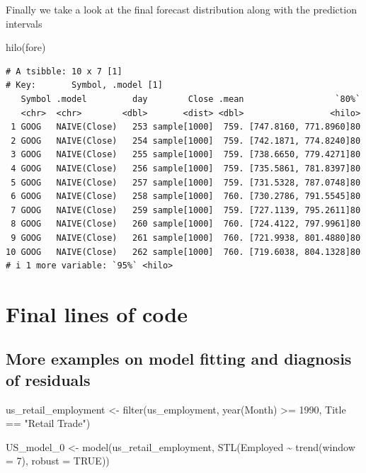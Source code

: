\documentclass[
  letterpaper,
  DIV=11,
  numbers=noendperiod]{scrartcl}
\newenvironment{Shaded}{\begin{snugshade}}{\end{snugshade}}
\newcommand{\AttributeTok}[1]{\textcolor[rgb]{0.40,0.45,0.13}{#1}}
\newcommand{\ConstantTok}[1]{\textcolor[rgb]{0.56,0.35,0.01}{#1}}
\newcommand{\DecValTok}[1]{\textcolor[rgb]{0.68,0.00,0.00}{#1}}
\newcommand{\FunctionTok}[1]{\textcolor[rgb]{0.28,0.35,0.67}{#1}}
\newcommand{\NormalTok}[1]{\textcolor[rgb]{0.00,0.23,0.31}{#1}}
\newcommand{\OtherTok}[1]{\textcolor[rgb]{0.00,0.23,0.31}{#1}}
\newcommand{\SpecialCharTok}[1]{\textcolor[rgb]{0.37,0.37,0.37}{#1}}
\newcommand{\StringTok}[1]{\textcolor[rgb]{0.13,0.47,0.30}{#1}}
\newcommand*\circled[1]{\tikz[baseline=(char.base)]{
          \node[shape=circle,draw,inner sep=1pt] (char) {{\scriptsize#1}};}}
\begin{document}
Finally we take a look at the final forecast distribution along with the
prediction intervals

\begin{Shaded}
\begin{Highlighting}[]
\FunctionTok{hilo}\NormalTok{(fore)}
\end{Highlighting}
\end{Shaded}

\begin{verbatim}
# A tsibble: 10 x 7 [1]
# Key:       Symbol, .model [1]
   Symbol .model         day        Close .mean                  `80%`
   <chr>  <chr>        <dbl>       <dist> <dbl>                 <hilo>
 1 GOOG   NAIVE(Close)   253 sample[1000]  759. [747.8160, 771.8960]80
 2 GOOG   NAIVE(Close)   254 sample[1000]  759. [742.1871, 774.8240]80
 3 GOOG   NAIVE(Close)   255 sample[1000]  759. [738.6650, 779.4271]80
 4 GOOG   NAIVE(Close)   256 sample[1000]  759. [735.5861, 781.8397]80
 5 GOOG   NAIVE(Close)   257 sample[1000]  759. [731.5328, 787.0748]80
 6 GOOG   NAIVE(Close)   258 sample[1000]  760. [730.2786, 791.5545]80
 7 GOOG   NAIVE(Close)   259 sample[1000]  759. [727.1139, 795.2611]80
 8 GOOG   NAIVE(Close)   260 sample[1000]  760. [724.4122, 797.9961]80
 9 GOOG   NAIVE(Close)   261 sample[1000]  760. [721.9938, 801.4880]80
10 GOOG   NAIVE(Close)   262 sample[1000]  760. [719.6038, 804.1328]80
# i 1 more variable: `95%` <hilo>
\end{verbatim}

\section{Final lines of code}\label{final-lines-of-code}

\subsection{More examples on model fitting and diagnosis of
residuals}\label{more-examples-on-model-fitting-and-diagnosis-of-residuals}

\label{annotated-cell-40}%
\begin{Shaded}
\begin{Highlighting}[]
\NormalTok{us\_retail\_employment }\OtherTok{\textless{}{-}} \FunctionTok{filter}\NormalTok{(us\_employment, }\FunctionTok{year}\NormalTok{(Month) }\SpecialCharTok{\textgreater{}=} \DecValTok{1990}\NormalTok{,}
\NormalTok{                        Title }\SpecialCharTok{==} \StringTok{"Retail Trade"}\NormalTok{) }\hspace*{\fill}\NormalTok{\circled{1}}

\NormalTok{US\_model\_0 }\OtherTok{\textless{}{-}} \FunctionTok{model}\NormalTok{(us\_retail\_employment,}
              \FunctionTok{STL}\NormalTok{(Employed }\SpecialCharTok{\textasciitilde{}} \FunctionTok{trend}\NormalTok{(}\AttributeTok{window =} \DecValTok{7}\NormalTok{), }\AttributeTok{robust =} \ConstantTok{TRUE}\NormalTok{)) }\hspace*{\fill}\NormalTok{\circled{2}}
\end{Highlighting}
\end{Shaded}
\end{document}
